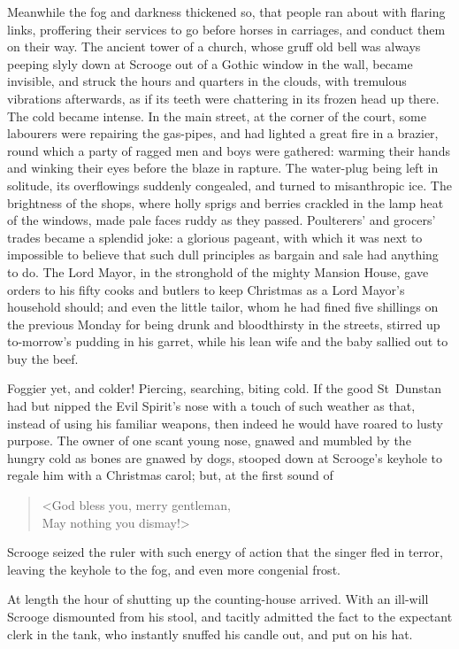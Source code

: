 Meanwhile the fog and darkness thickened so, that people ran about with flaring
links, proffering their services to go before hors\-es in carriages, and conduct
them on their way. The ancient tower of a church, whose gruff old bell was
always peeping slyly down at Scrooge out of a Gothic window in the wall, became
invisible, and struck the hours and quarters in the clouds, with tremulous
vibrations afterwards, as if its teeth were chattering in its frozen head up
there. The cold became intense. In the main street, at the corner of the court,
some labourers were repairing the gas-pipes, and had lighted a great fire in a
brazier, round which a party of ragged men and boys were gathered: warming their
hands and winking their eyes before the blaze in rapture. The water-plug being
left in solitude, its overflowings suddenly congealed, and turned to
misanthropic ice. The brightness of the shops, where holly sprigs and berries
crackled in the lamp heat of the windows, made pale faces ruddy as they passed.
Poulterers' and grocers' trades became a splendid joke: a glorious pageant, with
which it was next to impossible to believe that such dull principles as bargain
and sale had anything to do. The Lord Mayor, in the stronghold of the mighty
Mansion House, gave orders to his fifty cooks and butlers to keep Christmas as a
Lord Mayor's household should; and even the little tailor, whom he had fined
five shillings on the previous Monday for being drunk and bloodthirsty in the
streets, stirred up to-morrow's pudding in his garret, while his lean wife and
the baby sallied out to buy the beef.

Foggier yet, and colder! Piercing, searching, biting cold. If the good
St~Dunstan had but nipped the Evil Spirit's nose with a touch of such weather as
that, instead of using his familiar weapons, then indeed he would have roared to
lusty purpose. The owner of one scant young nose, gnawed and mumbled by the
hungry cold as bones are gnawed by dogs, stooped down at Scrooge's keyhole to
regale him with a Christmas carol; but, at the first sound of

\blockquote{<God bless you, merry gentleman,\\
  May nothing you dismay!>}

\noindent Scrooge seized the ruler with such energy of action that the singer
fled in terror, leaving the keyhole to the fog, and even more congenial frost.

At length the hour of shutting up the count\-ing-house arrived. With an ill-will
Scrooge dismounted from his stool, and tacitly admitted the fact to the
expectant clerk in the tank, who instantly snuffed his candle out, and put on
his hat.

